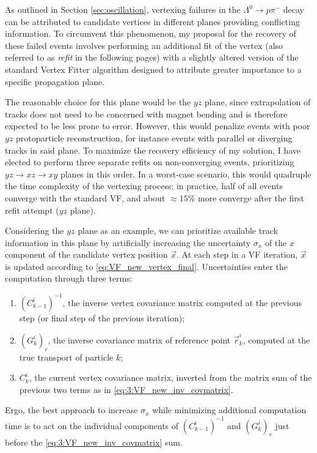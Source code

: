 
As outlined in Section \ref{sec:oscillation}, vertexing failures in the $\Lambda^0 \rightarrow p\pi^-$ decay can be attributed to candidate vertices in different planes providing conflicting information.
To circumvent this phenomenon, my proposal for the recovery of these failed events involves performing an additional fit of the vertex (also referred to as \textit{refit} in the following pages) with a slightly altered version of the standard Vertex Fitter algorithm designed to attribute greater importance to a specific propagation plane.

The reasonable choice for this plane would be the $yz$ plane, since extrapolation of tracks does not need to be concerned with magnet bending and is therefore expected to be less prone to error.
However, this would penalize events with poor $yz$ protoparticle reconstruction, for instance events with parallel or diverging tracks in said plane.
To maximize the recovery efficiency of my solution, I have elected to perform three separate refits on non-converging events, prioritizing $yz \rightarrow xz \rightarrow xy$ planes in this order.
In a worst-case scenario, this would quadruple the time complexity of the vertexing process; in practice, half of all events converge with the standard VF, and about $\approx 15\%$ more converge after the first refit attempt ($yz$ plane).

Considering the $yz$ plane as an example, we can prioritize available track information in this plane by artificially increasing the uncertainty $\sigma_x$ of the $x$ component of the candidate vertex position $\vec{x}$.
At each step in a VF iteration, $\vec{x}$ is updated according to \eqref{eq:VF_new_vertex_final}.
Uncertainties enter the computation through three terms:
\begin{enumerate}
	\item ${(C_{k-1}^i)}^{-1}$, the inverse vertex covariance matrix computed at the previous step (or final step of the previous iteration);
	\item ${(G_k^i)}_r$, the inverse covariance matrix of reference point $\vec{r}_k^i$, computed at the true transport of particle $k$;
	\item $C_k^i$, the current vertex covariance matrix, inverted from the matrix sum of the previous two terms as in \eqref{eq:3:VF_new_inv_covmatrix}.
\end{enumerate}
Ergo, the best approach to increase $\sigma_x$ while minimizing additional computation time is to act on the individual components of ${(C_{k-1}^i)}^{-1}$ and ${(G_k^i)}_r$ just before the \eqref{eq:3:VF_new_inv_covmatrix} sum.

